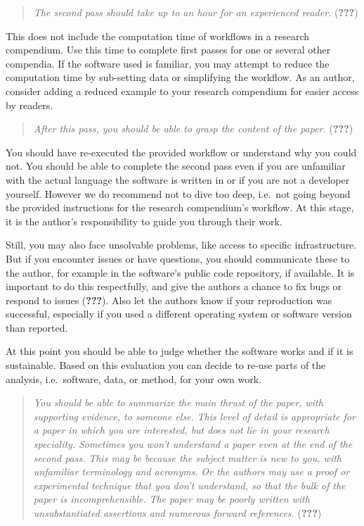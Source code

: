 \documentclass[twocolumn]{article}
\begin{document}
\begin{quote}
\emph{The second pass should take up to an hour for an experienced
reader.} ({\textbf{???}})
\end{quote}

This does not include the computation time of workflows in a research
compendium. Use this time to complete first passes for one or several
other compendia. If the software used is familiar, you may attempt to
reduce the computation time by sub-setting data or simplifying the
workflow. As an author, consider adding a reduced example to your
research compendium for easier access by readers.

\begin{quote}
\emph{After this pass, you should be able to grasp the content of the
paper.} ({\textbf{???}})
\end{quote}

You should have re-executed the provided workflow or understand why you
could not. You should be able to complete the second pass even if you
are unfamiliar with the actual language the software is written in or if
you are not a developer yourself. However we do recommend not to dive
too deep, i.e.~not going beyond the provided instructions for the
research compendium's workflow. At this stage, it is the author's
responsibility to guide you through their work.

Still, you may also face unsolvable problems, like access to specific
infrastructure. But if you encounter issues or have questions, you
should communicate these to the author, for example in the software's
public code repository, if available. It is important to do this
respectfully, and give the authors a chance to fix bugs or respond to
issues ({\textbf{???}}). Also let the authors know if your reproduction
was successful, especially if you used a different operating system or
software version than reported.

At this point you should be able to judge whether the software works and
if it is sustainable. Based on this evaluation you can decide to re-use
parts of the analysis, i.e.~software, data, or method, for your own
work.

\begin{quote}
\emph{You should be able to summarize the main thrust of the paper, with
supporting evidence, to someone else.} \emph{This level of detail is
appropriate for a paper in which you are interested, but does not lie in
your research speciality.} \emph{Sometimes you won't understand a paper
even at the end of the second pass.} \emph{This may be because the
subject matter is new to you, with unfamiliar terminology and acronyms.}
\emph{Or the authors may use a proof or experimental technique that you
don't understand, so that the bulk of the paper is incomprehensible.}
\emph{The paper may be poorly written with unsubstantiated assertions
and numerous forward references.} ({\textbf{???}})
\end{quote}
\end{document}
